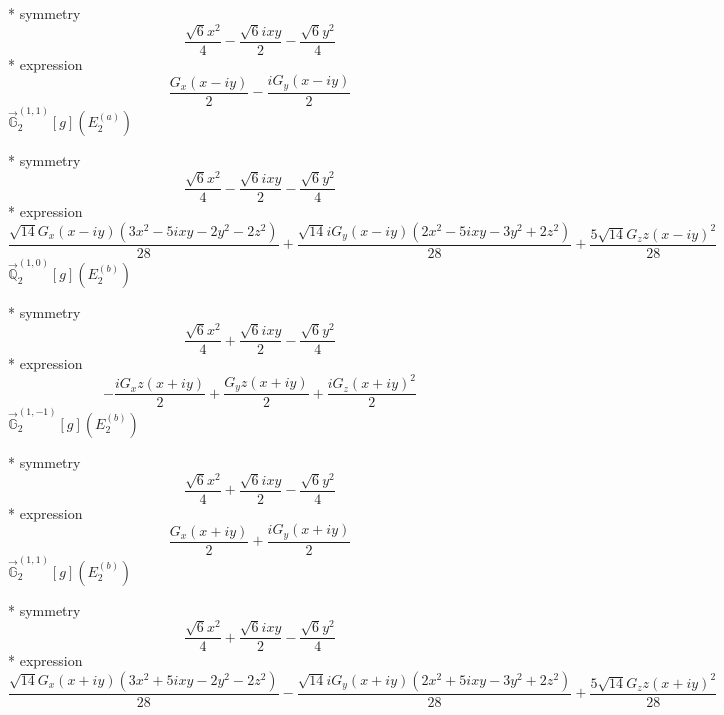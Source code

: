 \documentclass[fleqn,8pt]{jsarticle}
\begin{document}
\noindent\quad ** symmetry
\begin{dmath*}
\frac{\sqrt{6} x^{2}}{4} - \frac{\sqrt{6} i x y}{2} - \frac{\sqrt{6} y^{2}}{4}
\end{dmath*}
\noindent\quad ** expression
\begin{dmath*}
\frac{G_{x} \left(x - i y\right)}{2} - \frac{i G_{y} \left(x - i y\right)}{2}
\end{dmath*}
\noindent\quad $\vec{\mathbb{G}}_{2}^{(1,1)}[g](E_{2}^{(a)})$

\noindent\quad ** symmetry
\begin{dmath*}
\frac{\sqrt{6} x^{2}}{4} - \frac{\sqrt{6} i x y}{2} - \frac{\sqrt{6} y^{2}}{4}
\end{dmath*}
\noindent\quad ** expression
\begin{dmath*}
\frac{\sqrt{14} G_{x} \left(x - i y\right) \left(3 x^{2} - 5 i x y - 2 y^{2} - 2 z^{2}\right)}{28} + \frac{\sqrt{14} i G_{y} \left(x - i y\right) \left(2 x^{2} - 5 i x y - 3 y^{2} + 2 z^{2}\right)}{28} + \frac{5 \sqrt{14} G_{z} z \left(x - i y\right)^{2}}{28}
\end{dmath*}
\noindent\quad $\vec{\mathbb{Q}}_{2}^{(1,0)}[g](E_{2}^{(b)})$

\noindent\quad ** symmetry
\begin{dmath*}
\frac{\sqrt{6} x^{2}}{4} + \frac{\sqrt{6} i x y}{2} - \frac{\sqrt{6} y^{2}}{4}
\end{dmath*}
\noindent\quad ** expression
\begin{dmath*}
- \frac{i G_{x} z \left(x + i y\right)}{2} + \frac{G_{y} z \left(x + i y\right)}{2} + \frac{i G_{z} \left(x + i y\right)^{2}}{2}
\end{dmath*}
\noindent\quad $\vec{\mathbb{G}}_{2}^{(1,-1)}[g](E_{2}^{(b)})$

\noindent\quad ** symmetry
\begin{dmath*}
\frac{\sqrt{6} x^{2}}{4} + \frac{\sqrt{6} i x y}{2} - \frac{\sqrt{6} y^{2}}{4}
\end{dmath*}
\noindent\quad ** expression
\begin{dmath*}
\frac{G_{x} \left(x + i y\right)}{2} + \frac{i G_{y} \left(x + i y\right)}{2}
\end{dmath*}
\noindent\quad $\vec{\mathbb{G}}_{2}^{(1,1)}[g](E_{2}^{(b)})$

\noindent\quad ** symmetry
\begin{dmath*}
\frac{\sqrt{6} x^{2}}{4} + \frac{\sqrt{6} i x y}{2} - \frac{\sqrt{6} y^{2}}{4}
\end{dmath*}
\noindent\quad ** expression
\begin{dmath*}
\frac{\sqrt{14} G_{x} \left(x + i y\right) \left(3 x^{2} + 5 i x y - 2 y^{2} - 2 z^{2}\right)}{28} - \frac{\sqrt{14} i G_{y} \left(x + i y\right) \left(2 x^{2} + 5 i x y - 3 y^{2} + 2 z^{2}\right)}{28} + \frac{5 \sqrt{14} G_{z} z \left(x + i y\right)^{2}}{28}
\end{dmath*}
\end{document}

